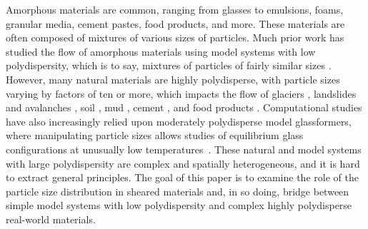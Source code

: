 \documentclass[%
 reprint,
 amsmath,amssymb,
 aps,
]{revtex4-2}
\begin{document}
Amorphous materials are common, ranging from glasses to emulsions, foams, granular media, cement pastes, food products, and more.  These materials are often composed of mixtures of various sizes of particles.  Much prior work has studied the flow of amorphous materials using model systems with low polydispersity, which is to say, mixtures of particles of fairly similar sizes
\cite{liu96,mason97emulsions,hebraud97,petekidis02,schall07,chen10,vasisht18,tsai21,yamamoto97,falk98,teitel07,utter08,lemaitre09,manning11,cubuk15,hassani19,losert00,patinet2016connecting}.  However, many natural materials are highly polydisperse, with particle sizes varying by factors of ten or more, which impacts the flow of glaciers \cite{haeberli06}, landslides and avalanches \cite{pitman05}, soil \cite{or02}, mud \cite{besq03}, cement \cite{rosquoet03}, and food products \cite{taylor09}. Computational studies have also increasingly relied upon moderately polydisperse model glassformers, where manipulating particle sizes allows studies of equilibrium glass configurations at unusually low temperatures~\cite{ninarello2017models,berthier2017configurational,brito2018theory,kapteijns2019fast}. These natural and model systems with large polydispersity are complex and spatially heterogeneous, and it is hard to extract general principles.  The goal of this paper is to examine the role of the particle size distribution in sheared materials and, in so doing, bridge between simple model systems with low polydispersity and complex highly polydisperse real-world materials.
\end{document}
